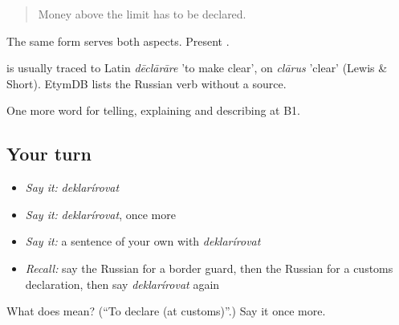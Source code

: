 \begin{quote}
Money above the limit has to be declared.
\end{quote}

The same form serves both aspects. Present \emph{}.

\begin{cousinweb}
\emph{} is usually traced to Latin \emph{dēclārāre} 'to make clear', on \emph{clārus} 'clear' (Lewis \& Short). EtymDB lists the Russian verb without a source.
\end{cousinweb}

\begin{grammarlens}[title={What you've built}]
One more word for telling, explaining and describing at B1.
\end{grammarlens}

\subsection*{Your turn}
\begin{itemize}
\raggedright
  \item \emph{Say it:} \emph{deklarírovat}
  \item \emph{Say it:} \emph{deklarírovat}, once more
  \item \emph{Say it:} a sentence of your own with \emph{deklarírovat}
  \item \emph{Recall:} say the Russian for a border guard, then the Russian for a customs declaration, then say \emph{deklarírovat} again
\end{itemize}

\begin{tcolorbox}[breakable,colback=teal!4,colframe=teal!35!black,title={Before you move on}]
What does  mean? (\textquotedblleft{}To declare (at customs)\textquotedblright{}.) Say it once more.
\end{tcolorbox}
